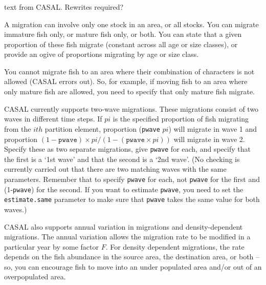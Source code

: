 \subsubsection{}
\KL text from CASAL. Rewrites required? \KLend



A migration can involve only one stock in an area, or all stocks. You can migrate immature fish only, or mature fish only, or both. You can state that a given proportion of these fish migrate (constant across all age or size classes), or provide an ogive of proportions migrating by age or size class.

You cannot migrate fish to an area where their combination of characters is not allowed (CASAL errors out). So, for example, if moving fish to an area where only mature fish are allowed, you need to specify that only mature fish migrate.

CASAL currently supports two-wave migrations. These migrations consist of two waves in different time steps. If $pi$ is the specified proportion of fish migrating from the $ith$ partition element, proportion (\texttt{pwave} $pi$) will migrate in wave 1 and proportion $(1 - \texttt{pwave})×pi/(1 - (\texttt{pwave} × pi))$ will migrate in wave 2. Specify these as two separate migrations, give \texttt{pwave} for each, and specify that the first is a `1st wave' and that the second is a `2nd wave'. (No checking is currently carried out that there are two matching waves with the same parameters. Remember that to specify \texttt{pwave} for each, not \texttt{pwave} for the first and (1-\texttt{pwave}) for the second. If you want to estimate \texttt{pwave}, you need to set the \texttt{estimate.same} parameter to make sure that \texttt{pwave} takes the same value for both waves.)

CASAL also supports annual variation in migrations and density-dependent migrations. The annual variation allows the migration rate to be modified in a particular year by some factor $F$. For density dependent migrations, the rate depends on the fish abundance in the source area, the destination area, or both \mbox{--} so, you can encourage fish to move into an under populated area and/or out of an overpopulated area.

